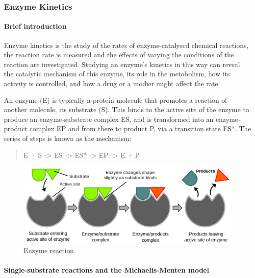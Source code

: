 \pagebreak

\hypertarget{enzyme-kinetics}{%
\subsubsection{Enzyme Kinetics}\label{enzyme-kinetics}}

\hypertarget{brief-introduction}{%
\paragraph{Brief introduction}\label{brief-introduction}}

Enzyme kinetics is the study of the rates of enzyme-catalysed chemical
reactions, the reaction rate is measured and the effects of varying the
conditions of the reaction are investigated. Studying an enzyme's
kinetics in this way can reveal the catalytic mechanism of this enzyme,
its role in the metobolism, how its activity is controlled, and how a
drug or a modier might affect the rate.

An enzyme (E) is typically a protein molecule that promotes a reaction
of another molecule, its substrate (S). This binds to the active site of
the enzyme to produce an enzyme-substrate complex ES, and is transformed
into an enzyme-product complex EP and from there to product P, via a
transition state ES*. The series of steps is known as the mechanism:

\begin{quote}
E + S -\textgreater{} ES -\textgreater{} ES* -\textgreater{} EP
-\textgreater{} E + P
\end{quote}

\begin{figure}
\centering
\includegraphics{./media/enzyme_action.png}
\caption{Enzyme reaction}
\end{figure}

\hypertarget{single-substrate-reactions-and-the-michaelis-menten-model}{%
\paragraph{Single-substrate reactions and the Michaelis-Menten
model}\label{single-substrate-reactions-and-the-michaelis-menten-model}}

